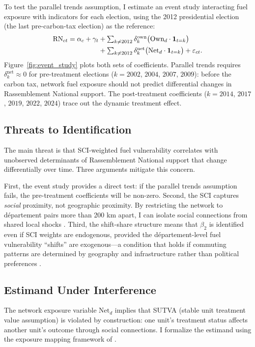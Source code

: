 \documentclass[12pt]{article}
\newcommand{\rn}{Rassemblement National}
\newcommand{\dept}{d\'{e}partement}
\begin{document}
To test the parallel trends assumption, I estimate an event study interacting fuel exposure with indicators for each election, using the 2012 presidential election (the last pre-carbon-tax election) as the reference:
\begin{align}
\text{RN}_{ct} = \alpha_c + \gamma_t &+ \textstyle\sum_{k \neq 2012} \delta^{\text{own}}_k \bigl(\text{Own}_d \cdot \mathbf{1}_{t=k}\bigr) \notag \\
&+ \textstyle\sum_{k \neq 2012} \delta^{\text{net}}_k \bigl(\text{Net}_d \cdot \mathbf{1}_{t=k}\bigr) + \varepsilon_{ct}.
\label{eq:event_study}
\end{align}
Figure~\ref{fig:event_study} plots both sets of coefficients. Parallel trends requires $\delta^{\text{net}}_k \approx 0$ for pre-treatment elections ($k = 2002$, $2004$, $2007$, $2009$): before the carbon tax, network fuel exposure should not predict differential changes in \rn{} support. The post-treatment coefficients ($k = 2014$, $2017$, $2019$, $2022$, $2024$) trace out the dynamic treatment effect.

\subsection{Threats to Identification}

The main threat is that SCI-weighted fuel vulnerability correlates with unobserved determinants of \rn{} support that change differentially over time. Three arguments mitigate this concern.

First, the event study provides a direct test: if the parallel trends assumption fails, the pre-treatment coefficients will be non-zero. Second, the SCI captures \emph{social} proximity, not geographic proximity. By restricting the network to \dept{} pairs more than 200 km apart, I can isolate social connections from shared local shocks \citep{bailey2020social}. Third, the shift-share structure means that $\beta_2$ is identified even if SCI weights are endogenous, provided the \dept{}-level fuel vulnerability ``shifts'' are exogenous---a condition that holds if commuting patterns are determined by geography and infrastructure rather than political preferences \citep{borusyak2022quasi}.

\subsection{Estimand Under Interference}
\label{sec:estimand}

The network exposure variable $\text{Net}_d$ implies that SUTVA (stable unit treatment value assumption) is violated by construction: one unit's treatment status affects another unit's outcome through social connections. I formalize the estimand using the exposure mapping framework of \citet{aronow2017estimating}.
\end{document}
